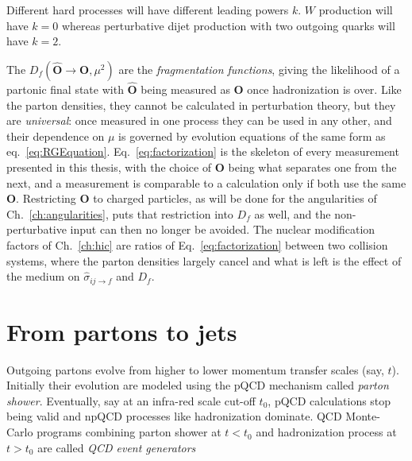 Different hard processes will have different leading powers \(k\). \(W\) production will have \(k=0\) whereas perturbative dijet production with two outgoing quarks will have \(k=2\). 

The \(D_f(\hat{\mathbf{O}}\to\mathbf{O}, \mu^2)\) are the \emph{fragmentation functions}, giving the likelihood of a partonic final state with \(\hat{\mathbf{O}}\) being measured as \(\mathbf{O}\) once hadronization is over.
%
Like the parton densities, they cannot be calculated in perturbation theory, but they are \emph{universal}: once measured in one process they can be used in any other, and their dependence on \(\mu\) is governed by evolution equations of the same form as eq.~\ref{eq:RGEquation}.
%
Eq.~\ref{eq:factorization} is the skeleton of every measurement presented in this thesis, with the choice of \(\mathbf{O}\) being what separates one from the next, and a measurement is comparable to a calculation only if both use the same \(\mathbf{O}\).
%
Restricting \(\mathbf{O}\) to charged particles, as will be done for the angularities of Ch.~\ref{ch:angularities}, puts that restriction into \(D_f\) as well, and the non-perturbative input can then no longer be avoided.
%
The nuclear modification factors of Ch.~\ref{ch:hic} are ratios of Eq.~\ref{eq:factorization} between two collision systems, where the parton densities largely cancel and what is left is the effect of the medium on \(\hat{\sigma}_{ij\to f}\) and \(D_f\). 


\section{From partons to jets}
\label{sec:partonShower}
Outgoing partons evolve from higher to lower momentum transfer scales (say, \(t\)). Initially their evolution are modeled using the pQCD mechanism called \emph{parton shower}. Eventually, say at an infra-red scale cut-off \(t_0\), pQCD calculations stop being valid and npQCD processes like hadronization dominate. QCD Monte-Carlo programs combining parton shower at \(t < t_0\) and hadronization process at \(t > t_0\)  are called \emph{QCD event generators}


